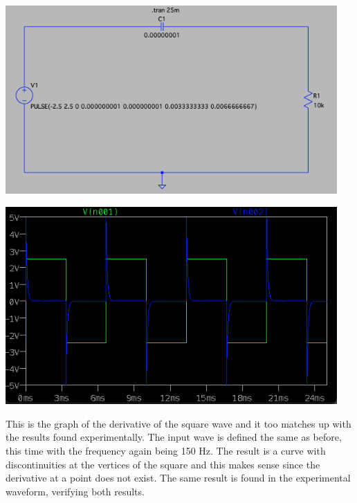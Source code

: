 \documentclass[12pt]{article}
\newcommand{\objects}[2]{%
  \leavevmode\vbox{\hbox{#1}\nointerlineskip\hbox{#2}}%
}
\begin{document}
    \begin{center}
        \objects
            {\includegraphics[width=0.95\textwidth]{4.3.5 LTSpice Circuit.png}}
            \:
            {\includegraphics[width=0.95\textwidth]{4.3.5 LTSpice Output.png}}
    \end{center}
    \par This is the graph of the derivative of the square wave and it too matches up with the results found experimentally. The input wave is defined the same as before, this time with the frequency again being 150 Hz. The result is a curve with discontinuities at the vertices of the square and this makes sense since the derivative at a point does not exist. The same result is found in the experimental waveform, verifying both results.
    \newpage
\end{document}
